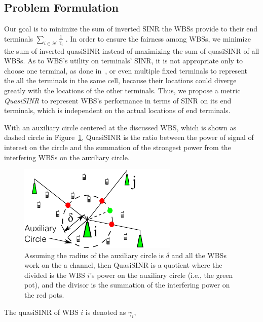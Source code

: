 \documentclass[times]{ettauth}
\newcommand{\ie}{i.e., }
\theoremstyle{mytheoremstyle}
\theoremstyle{mytheoremstyle}
\theoremstyle{mytheoremstyle}
\begin{document}
\subsection{Problem Formulation}
\label{problemProposed}
Our goal is to minimize the sum of inverted SINR the WBSs provide to their end terminals $\sum_{i\in \mathcal{N}}\frac{1}{\gamma_{i}}$ .
In order to ensure the fairness among WBSs,  we minimize the sum of inverted quasiSINR instead of maximizing the sum of quasiSINR of all WBSs.
%
As to WBS's utility on terminals' SINR, it is not appropriate only to choose one terminal, as done in~\cite{spectrum_sharing_tvspace_2012}, or even multiple fixed terminals to represent the all the terminals in the same cell, because their locations could diverge greatly with the locations of the other terminals.
Thus, we propose a metric \textit{QuasiSINR} to represent WBS's performance in terms of SINR on its end terminals, which is independent on the actual locations of end terminals.


With an auxiliary circle centered at the discussed WBS, which is shown as dashed circle in Figure~\ref{quasiSINRfigure}, QuasiSINR is the ratio between the power of signal of interest on the circle and the summation of the strongest power from the interfering WBSs on the auxiliary circle.


\begin{figure}[h!]
  \centering
  \includegraphics[width=0.6\linewidth]{quasiSINR2_2.pdf}
  \caption{Assuming the radius of the auxiliary circle is $\delta$ and all the WBSs work on the a channel, then QuasiSINR is a quotient where the divided is the WBS $i$'s power on the auxiliary circle (\ie the green pot), and the divisor is the summation of the interfering power on the red pots.}
\label{quasiSINRfigure}
\end{figure}

The quasiSINR of WBS $i$ is denoted as $\gamma_{i}$, 
\end{document}
